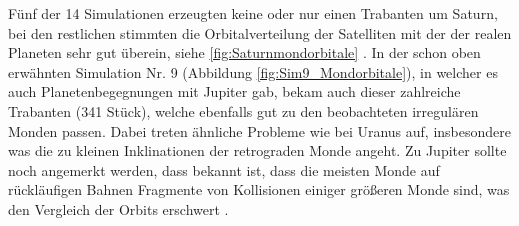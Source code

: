 \documentclass[12pt,a4paper,twoside,open=right,bibliography=totoc]{scrbook}
\renewcommand{\cite}{ \citep}
\begin{document}
Fünf der 14 Simulationen erzeugten keine oder nur einen Trabanten um Saturn, bei den restlichen stimmten die Orbitalverteilung der Satelliten mit der der realen Planeten sehr gut überein, siehe \ref{fig:Saturnmondorbitale}\cite{Nesvorny2007}.
In der schon oben erwähnten Simulation Nr. 9 (Abbildung \ref{fig:Sim9_Mondorbitale}), in welcher es auch Planetenbegegnungen mit Jupiter gab, bekam auch dieser zahlreiche Trabanten (341 Stück), welche ebenfalls gut zu den beobachteten irregulären Monden passen. Dabei treten ähnliche Probleme wie bei Uranus auf, insbesondere was die zu kleinen Inklinationen der retrograden Monde angeht.
Zu Jupiter sollte noch angemerkt werden, dass bekannt ist, dass die meisten Monde auf rückläufigen Bahnen Fragmente von Kollisionen einiger größeren Monde sind, was den Vergleich der Orbits erschwert\cite{Nesvorny2004,Nesvorny2007}.
\end{document}
